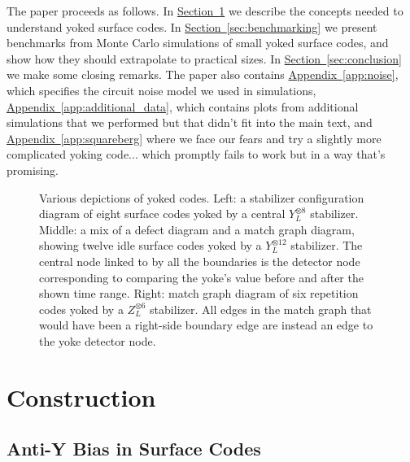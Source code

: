 \documentclass[onecolumn,unpublished,a4paper]{quantumarticle}
\theoremstyle{definition}
\theoremstyle{definition}
\theoremstyle{definition}
\renewcommand{\sec}[1]{\hyperref[sec:#1]{Section~\ref*{sec:#1}}}
\DeclareRobustCommand{\app}[1]{\hyperref[app:#1]{Appendix~\ref*{app:#1}}}
\begin{document}
The paper proceeds as follows.
In \sec{construction} we describe the concepts needed to understand yoked surface codes.
In \sec{benchmarking} we present benchmarks from Monte Carlo simulations of small yoked surface codes, and show how they should extrapolate to practical sizes.
In \sec{conclusion} we make some closing remarks.
The paper also contains \app{noise}, which specifies the circuit noise model we used in simulations, \app{additional_data}, which contains plots from additional simulations that we performed but that didn't fit into the main text, and \app{squareberg} where we face our fears and try a slightly more complicated yoking code... which promptly fails to work but in a way that's promising.

\begin{figure}[h]
    \centering
    \caption{
        Various depictions of yoked codes.
        Left: a stabilizer configuration diagram of eight surface codes yoked by a central $Y_L^{\otimes 8}$ stabilizer.
        Middle: a mix of a defect diagram and a match graph diagram, showing twelve idle surface codes yoked by a $Y_L^{\otimes 12}$ stabilizer.
        The central node linked to by all the boundaries is the detector node corresponding to comparing the yoke's value before and after the shown time range.
        Right: match graph diagram of six repetition codes yoked by a $Z_L^{\otimes 6}$ stabilizer.
        All edges in the match graph that would have been a right-side boundary edge are instead an edge to the yoke detector node.
    }
    \label{fig:yoke_depictions}
\end{figure}




\section{Construction}
\label{sec:construction}

\subsection{Anti-Y Bias in Surface Codes}
\end{document}
